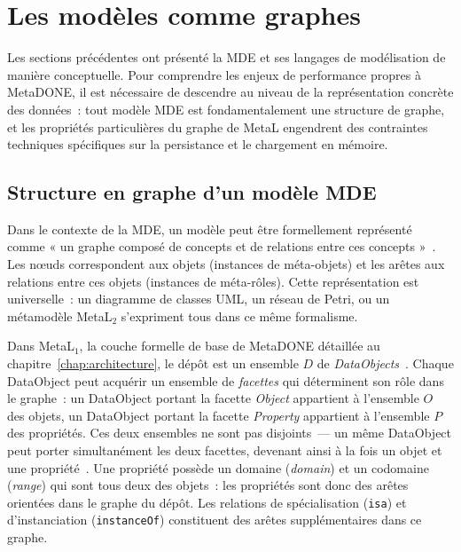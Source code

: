 \section{Les modèles comme graphes}
\label{sec:graphes}

Les sections précédentes ont présenté la MDE et ses langages de modélisation de manière conceptuelle. Pour comprendre les enjeux de performance propres à MetaDONE, il est nécessaire de descendre au niveau de la représentation concrète des données~: tout modèle MDE est fondamentalement une structure de graphe, et les propriétés particulières du graphe de MetaL engendrent des contraintes techniques spécifiques sur la persistance et le chargement en mémoire.

\subsection{Structure en graphe d'un modèle MDE}
\label{sec:graphes-mde}

Dans le contexte de la MDE, un modèle peut être formellement représenté comme « un graphe composé de concepts et de relations entre ces concepts »~\cite{bezivin2005model}. Les nœuds correspondent aux objets (instances de méta-objets) et les arêtes aux relations entre ces objets (instances de méta-rôles). Cette représentation est universelle~: un diagramme de classes UML, un réseau de Petri, ou un métamodèle MetaL$_2$ s'expriment tous dans ce même formalisme.

Dans MetaL$_1$, la couche formelle de base de MetaDONE détaillée au chapitre~\ref{chap:architecture}, le dépôt est un ensemble $D$ de \textit{DataObjects}~\cite{englebert_metal1}. Chaque DataObject peut acquérir un ensemble de \emph{facettes} qui déterminent son rôle dans le graphe~: un DataObject portant la facette \emph{Object} appartient à l'ensemble $O$ des objets, un DataObject portant la facette \emph{Property} appartient à l'ensemble $P$ des propriétés. Ces deux ensembles ne sont pas disjoints~--- un même DataObject peut porter simultanément les deux facettes, devenant ainsi à la fois un objet et une propriété~\cite{Eng2007}. Une propriété possède un domaine (\textit{domain}) et un codomaine (\textit{range}) qui sont tous deux des objets~: les propriétés sont donc des arêtes orientées dans le graphe du dépôt. Les relations de spécialisation (\texttt{isa}) et d'instanciation (\texttt{instanceOf}) constituent des arêtes supplémentaires dans ce graphe.

